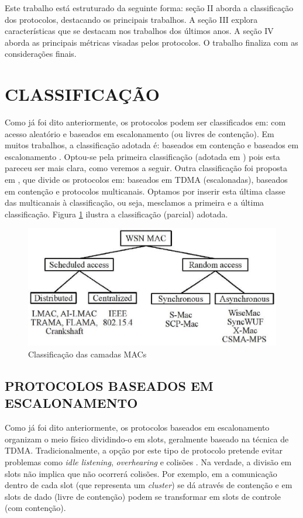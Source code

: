 \documentclass[12pt]{article}
\begin{document}
  Este trabalho está estruturado da seguinte forma: seção II aborda a classificação dos protocolos, destacando os principais trabalhos. A seção III explora características que se destacam nos trabalhos dos últimos anos. A seção IV aborda as principais métricas visadas pelos protocolos. O trabalho finaliza com as considerações finais.

  \section{CLASSIFICAÇÃO}
  \label{classificacao}
  Como já foi dito anteriormente, os protocolos podem ser classificados em: com acesso aleatório e baseados em escalonamento (ou livres de contenção). Em muitos trabalhos, a classificação adotada é: baseados em contenção e baseados em escalonamento \cite{20100312645920, 20084511683228}. Optou-se pela primeira classificação (adotada em \cite{kredo07}) pois esta pareceu ser mais clara, como veremos a seguir. Outra classificação foi proposta em \cite{20084511683228}, que divide os protocolos em: baseados em TDMA (escalonadas), baseados em contenção e protocolos multicanais. Optamos por inserir esta última classe das multicanais à classificação, ou seja, mesclamos a primeira e a última classificação. Figura \ref{fig:classicacao} ilustra a classificação (parcial) adotada.

\begin{figure}
\centering
\includegraphics[scale=0.35]{imagens/classificacao}
\caption{Classificação das camadas MACs \cite{20085211817614}}
\label{fig:classicacao}
\end{figure}

  \subsection{PROTOCOLOS BASEADOS EM ESCALONAMENTO}
    Como já foi dito anteriormente, os protocolos baseados em escalonamento organizam o meio físico dividindo-o em slots, geralmente baseado na técnica de TDMA. Tradicionalmente, a opção por este tipo de protocolo pretende evitar problemas como \textit{idle listening}, \textit{overhearing} e colisões \cite{20100312645920}. Na verdade, a divisão em slots não implica que não ocorrerá colisões. Por exemplo, em \cite{20102813064978} a comunicação dentro de cada slot (que representa um \textit{cluster}) se dá através de contenção e em \cite{20083811560517} slots de dado (livre de contenção) podem se transformar em slots de controle (com contenção). 
    
\end{document}
